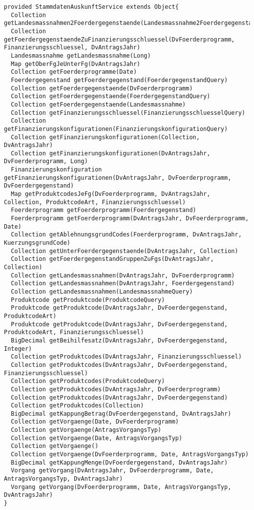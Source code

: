 \begin{lstlisting}[style = dsl, caption = Deklaration von StammdatenAuskunftService, captionpos = b, label = lst_std]
provided StammdatenAuskunftService extends Object{
  Collection getLandesmassnahmen2Foerdergegenstaende(Landesmassnahme2FoerdergegenstandQuery)
  Collection getFoerdergegenstaendeZuFinanzierungsschluessel(DvFoerderprogramm, Finanzierungsschluessel, DvAntragsJahr)
  Landesmassnahme getLandesmassnahme(Long)
  Map getOberFgJeUnterFg(DvAntragsJahr)
  Collection getFoerderprogramme(Date)
  Foerdergegenstand getFoerdergegenstand(FoerdergegenstandQuery)
  Collection getFoerdergegenstaende(DvFoerderprogramm)
  Collection getFoerdergegenstaende(FoerdergegenstandQuery)
  Collection getFoerdergegenstaende(Landesmassnahme)
  Collection getFinanzierungsschluessel(FinanzierungsschluesselQuery)
  Collection getFinanzierungskonfigurationen(FinanzierungskonfigurationQuery)
  Collection getFinanzierungskonfigurationen(Collection, DvAntragsJahr)
  Collection getFinanzierungskonfigurationen(DvAntragsJahr, DvFoerderprogramm, Long)
  Finanzierungskonfiguration getFinanzierungskonfigurationen(DvAntragsJahr, DvFoerderprogramm, DvFoerdergegenstand)
  Map getProduktcodesJeFg(DvFoerderprogramm, DvAntragsJahr, Collection, ProduktcodeArt, Finanzierungsschluessel)
  Foerderprogramm getFoerderprogramm(Foerdergegenstand)
  Foerderprogramm getFoerderprogramm(DvAntragsJahr, DvFoerderprogramm, Date)
  Collection getAblehnungsgrundCodes(Foerderprogramm, DvAntragsJahr, KuerzungsgrundCode)
  Collection getUnterFoerdergegenstaende(DvAntragsJahr, Collection)
  Collection getFoerdergegenstandGruppenZuFgs(DvAntragsJahr, Collection)
  Collection getLandesmassnahmen(DvAntragsJahr, DvFoerderprogramm)
  Collection getLandesmassnahmen(DvAntragsJahr, Foerdergegenstand)
  Collection getLandesmassnahmen(LandesmassnahmeQuery)
  Produktcode getProduktcode(ProduktcodeQuery)
  Produktcode getProduktcode(DvAntragsJahr, DvFoerdergegenstand, ProduktcodeArt)
  Produktcode getProduktcode(DvAntragsJahr, DvFoerdergegenstand, ProduktcodeArt, Finanzierungsschluessel)
  BigDecimal getBeihilfesatz(DvAntragsJahr, DvFoerdergegenstand, Integer)
  Collection getProduktcodes(DvAntragsJahr, Finanzierungsschluessel)
  Collection getProduktcodes(DvAntragsJahr, DvFoerdergegenstand, Finanzierungsschluessel)
  Collection getProduktcodes(ProduktcodeQuery)
  Collection getProduktcodes(DvAntragsJahr, DvFoerderprogramm)
  Collection getProduktcodes(DvAntragsJahr, DvFoerdergegenstand)
  Collection getProduktcodes(Collection)
  BigDecimal getKappungBetrag(DvFoerdergegenstand, DvAntragsJahr)
  Collection getVorgaenge(Date, DvFoerderprogramm)
  Collection getVorgaenge(AntragsVorgangsTyp)
  Collection getVorgaenge(Date, AntragsVorgangsTyp)
  Collection getVorgaenge()
  Collection getVorgaenge(DvFoerderprogramm, Date, AntragsVorgangsTyp)
  BigDecimal getKappungMenge(DvFoerdergegenstand, DvAntragsJahr)
  Vorgang getVorgang(DvAntragsJahr, DvFoerderprogramm, Date, AntragsVorgangsTyp, DvAntragsJahr)
  Vorgang getVorgang(DvFoerderprogramm, Date, AntragsVorgangsTyp, DvAntragsJahr)
}
\end{lstlisting}

